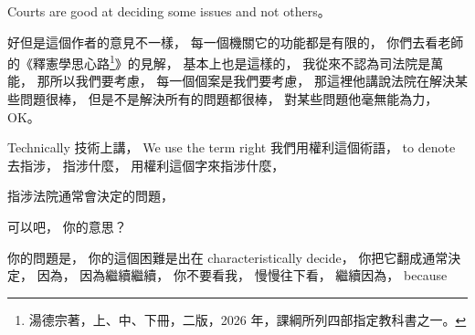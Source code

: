 \hypertarget{w06:cue:2210}{}Courts are good at deciding some issues and not others。

\hypertarget{w06:cue:2211}{}好但是這個作者的意見不一樣，
\hypertarget{w06:cue:2212}{}每一個機關它的功能都是有限的，
\hypertarget{w06:cue:2213}{}你們去看老師的《釋憲學思心路\footnote{湯德宗著，上、中、下冊，二版，2026 年，課綱所列四部指定教科書之一。}》的見解，
\hypertarget{w06:cue:2214}{}基本上也是這樣的，
\hypertarget{w06:cue:2215}{}我從來不認為司法院是萬能，
\hypertarget{w06:cue:2216}{}那所以我們要考慮，
\hypertarget{w06:cue:2217}{}每一個個案是我們要考慮，
\hypertarget{w06:cue:2218}{}那這裡他講說法院在解決某些問題很棒，
\hypertarget{w06:cue:2219}{}但是不是解決所有的問題都很棒，
\hypertarget{w06:cue:2220}{}對某些問題他毫無能為力，
\hypertarget{w06:cue:2221}{}OK。

\hypertarget{w06:cue:2222}{}Technically 技術上講，
\hypertarget{w06:cue:2223}{}We use the term right
\hypertarget{w06:cue:2224}{}我們用權利這個術語，
\hypertarget{w06:cue:2225}{}to denote
\hypertarget{w06:cue:2226}{}去指涉，
\hypertarget{w06:cue:2227}{}指涉什麼，
\hypertarget{w06:cue:2228}{}用權利這個字來指涉什麼，

\hypertarget{w06:cue:2229}{}指涉法院通常會決定的問題，

\hypertarget{w06:cue:2230}{}可以吧，
\hypertarget{w06:cue:2231}{}你的意思？

\hypertarget{w06:cue:2232}{}你的問題是，
\hypertarget{w06:cue:2233}{}你的這個困難是出在 characteristically decide，
\hypertarget{w06:cue:2234}{}你把它翻成通常決定，
\hypertarget{w06:cue:2235}{}因為，
\hypertarget{w06:cue:2236}{}因為繼續繼續，
\hypertarget{w06:cue:2237}{}你不要看我，
\hypertarget{w06:cue:2238}{}慢慢往下看，
\hypertarget{w06:cue:2239}{}繼續因為，
\hypertarget{w06:cue:2240}{}because

